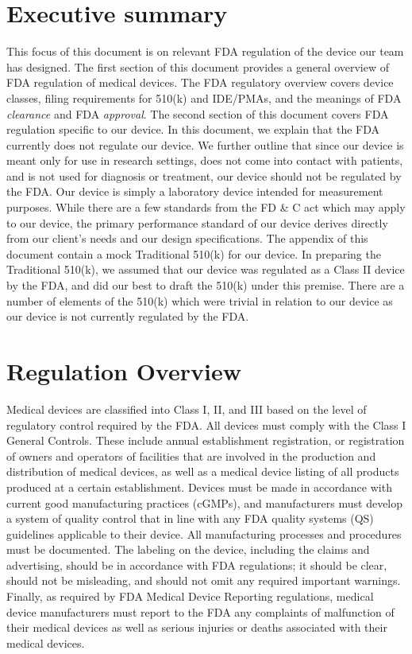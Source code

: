 \documentclass{article}
\begin{document}

\setcounter{tocdepth}{3}
\tableofcontents
\newpage

\section*{Executive summary}
\label{sec:exec-summary}
This focus of this document is on relevant FDA regulation of the
device our team has designed. The first section of this document
provides a general overview of FDA regulation of medical devices. The
FDA regulatory overview covers device classes, filing requirements for
510(k) and IDE/PMAs, and the meanings of FDA \textit{clearance} and
FDA \textit{approval}. The second section of this document covers FDA
regulation specific to our device. In this document, we explain that
the FDA currently does not regulate our device. We further outline
that since our device is meant only for use in research settings, does
not come into contact with patients, and is not used for diagnosis or
treatment, our device should not be regulated by the FDA. Our device
is simply a laboratory device intended for measurement purposes. While
there are a few standards from the FD \& C act which may apply to our
device, the primary performance standard of our device derives
directly from our client's needs and our design specifications. The
appendix of this document contain a mock Traditional 510(k) for our
device. In preparing the Traditional 510(k), we assumed that our
device was regulated as a Class II device by the FDA, and did our best
to draft the 510(k) under this premise. There are a number of elements
of the 510(k) which were trivial in relation to our device as our
device is not currently regulated by the FDA. 

\newpage
\section{Regulation Overview}
\label{sec:test-administration}

Medical devices are classified into Class I, II, and III based on the
level of regulatory control required by the FDA. All devices must
comply with the Class I General Controls. These include annual
establishment registration, or registration of owners and operators of
facilities that are involved in the production and distribution of
medical devices, as well as a medical device listing of all products
produced at a certain establishment. Devices must be made in
accordance with current good manufacturing practices (cGMPs), and
manufacturers must develop a system of quality control that in line
with any FDA quality systems (QS) guidelines applicable to their
device. All manufacturing processes and procedures must be
documented. The labeling on the device, including the claims and
advertising, should be in accordance with FDA regulations; it should
be clear, should not be misleading, and should not omit any required
important warnings. Finally, as required by FDA Medical Device
Reporting regulations, medical device manufacturers must report to the
FDA any complaints of malfunction of their medical devices as well as
serious injuries or deaths associated with their medical devices.
\end{document}
